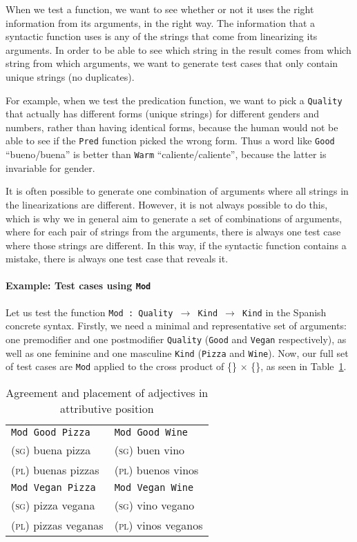 \documentclass[runningheads]{llncs}
\def\t#1{\texttt{#1}}
\begin{document}
When we test a function, we want to see whether or not it uses the right information from its arguments, in the right way. The information that a syntactic function uses is any of the strings that come from linearizing its arguments. In order to be able to see which string in the result comes from which string from which arguments, we want to generate test cases that only contain unique strings (no duplicates).

For example, when we test the predication function, we want to pick a
\t{Quality} that actually has different forms (unique strings) for 
different genders and numbers, rather than having identical forms,
because the human would not be able to see if the \t{Pred} function
picked the wrong form. Thus a word like \t{Good} ``bueno/buena'' is
better than \t{Warm} ``caliente/caliente'', because the latter is
invariable for gender.

It is often possible to generate one combination of arguments where
all strings in the linearizations are different. However, it is not
always possible to do this, which is why we in general aim to generate
a set of combinations of arguments, where for each pair of strings
from the arguments, there is always one test case where those strings
are different. In this way, if the syntactic function contains a
mistake, there is always one test case that reveals it.

\paragraph{Example: Test cases using \t{Mod}} Let us test the function
\t{Mod : Quality $\rightarrow$ Kind $\rightarrow$ Kind} in the Spanish
concrete syntax.
Firstly, we need a minimal and representative set of arguments:
one premodifier and one postmodifier \t{Quality} (\t{Good} and
\t{Vegan} respectively), as well as one feminine and one masculine
\t{Kind} (\t{Pizza} and \t{Wine}). Now, our full set of test cases are
\t{Mod} applied to the cross product of \{\} $\times$ \{\}, as seen in Table~\ref{tab:adjAttr}.

\begin{table}
\caption{Agreement and placement of adjectives in attributive position}
\label{tab:adjAttr}
\centering
\begin{tabular}{| l | l |}
\hline
\t{Mod Good Pizza}   & \t{Mod Good Wine} \\ 
\textsc{(sg)} buena pizza             & \textsc{(sg)} buen vino \\
\textsc{(pl)} buenas pizzas           & \textsc{(pl)} buenos vinos \\ \hline

\t{Mod Vegan Pizza}   & \t{Mod Vegan Wine} \\ 
\textsc{(sg)} pizza  vegana            & \textsc{(sg)} vino  vegano \\
\textsc{(pl)} pizzas  veganas          & \textsc{(pl)} vinos  veganos \\ \hline
\end{tabular}
\end{table}
\end{document}
